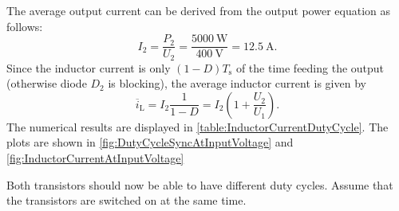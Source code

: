 \begin{solutionblock}
	The average output current can be derived from the output power equation as follows:
	\begin{equation}
		I_\mathrm{2}=\frac{P_\mathrm{2}}{U_\mathrm{2}} = \frac{\SI{5000}{\watt}}{\SI{400}{\volt}}=\SI{12.5}{\ampere}.
	\end{equation}
	Since the inductor current is only $(1-D)T_\mathrm{s}$ of the time feeding the output (otherwise diode $D_2$ is blocking), the average inductor current is given by
	\begin{equation}
		\overline{i}_\mathrm{L}=I_\mathrm{2} \frac{1}{1-D} = I_\mathrm{2} \left(1+\frac{U_\mathrm{2}}{U_\mathrm{1}} \right).
		\label{eq:InductorCurrent}
	\end{equation}
	The numerical results are displayed in \autoref{table:InductorCurrentDutyCycle}. The plots are shown in
	\autoref{fig:DutyCycleSyncAtInputVoltage} and \autoref{fig:InductorCurrentAtInputVoltage}

	
	
	

\end{solutionblock}

\vspace{2em}\par
Both transistors should now be able to have different duty cycles. Assume that the transistors are switched on at the same time.


